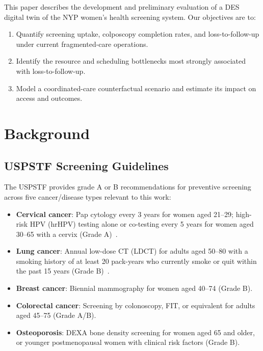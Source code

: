 \documentclass[12pt]{article}
\begin{document}
This paper describes the development and preliminary evaluation of a DES
digital twin of the NYP women's health screening system.
Our objectives are to:
\begin{enumerate}[leftmargin=2em]
  \item Quantify screening uptake, colposcopy completion rates, and
        loss-to-follow-up under current fragmented-care operations.
  \item Identify the resource and scheduling bottlenecks most strongly
        associated with loss-to-follow-up.
  \item Model a coordinated-care counterfactual scenario and estimate its
        impact on access and outcomes.
\end{enumerate}

\section{Background}

\subsection{USPSTF Screening Guidelines}

The USPSTF provides grade A or B recommendations for preventive screening
across five cancer/disease types relevant to this work:

\begin{itemize}[leftmargin=2em]
  \item \textbf{Cervical cancer}: Pap cytology every 3 years for women aged
        21--29; high-risk HPV (hrHPV) testing alone or co-testing every 5 years
        for women aged 30--65 with a cervix (Grade A)~\cite{uspstf_cervical}.
  \item \textbf{Lung cancer}: Annual low-dose CT (LDCT) for adults aged 50--80
        with a smoking history of at least 20 pack-years who currently smoke or
        quit within the past 15 years (Grade B)~\cite{amicizia2025}.
  \item \textbf{Breast cancer}: Biennial mammography for women aged 40--74
        (Grade B).
  \item \textbf{Colorectal cancer}: Screening by colonoscopy, FIT, or
        equivalent for adults aged 45--75 (Grade A/B).
  \item \textbf{Osteoporosis}: DEXA bone density screening for women aged 65
        and older, or younger postmenopausal women with clinical risk factors
        (Grade B).
\end{itemize}
\end{document}
